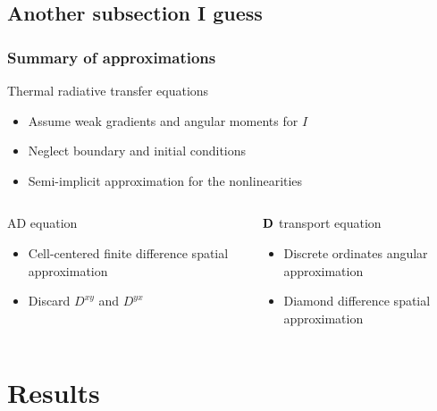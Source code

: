 \documentclass{beamer}
\newcommand{\Dtens}{\mat{D}}
\begin{document}
\subsection{Another subsection I guess}
\begin{frame}
  \frametitle{Summary of approximations}
  \begin{block}{Thermal radiative transfer equations}
    \begin{itemize}
      \item Assume weak gradients and angular moments for $I$
      \item Neglect boundary and initial conditions
      \item Semi-implicit approximation for the nonlinearities
    \end{itemize}
  \end{block}
  \begin{columns}[t]
    \begin{column}{.48\textwidth}
  \begin{block}{AD equation}
    \begin{itemize}
      \item Cell-centered finite difference spatial approximation
      \item Discard $D^{xy}$ and $D^{yx}$
    \end{itemize}
  \end{block}
    \end{column}
    \begin{column}{.48\textwidth}
  \begin{block}{$\Dtens$ transport equation}
    \begin{itemize}
      \item Discrete ordinates angular approximation
      \item Diamond difference spatial approximation
    \end{itemize}
  \end{block}
    \end{column}
  \end{columns}
\end{frame}
\section{Results}
\end{document}
